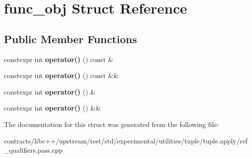 \hypertarget{structfunc__obj}{}\section{func\+\_\+obj Struct Reference}
\label{structfunc__obj}
\subsection*{Public Member Functions}
\begin{DoxyCompactItemize}
\item 
\mbox{\label{structfunc__obj_abd714d5d934540f3e192f5dba233d295}} 
constexpr int {\bfseries operator()} () const \&
\item 
\mbox{\label{structfunc__obj_a2850b3d57d5a4b64112e5f162feb6031}} 
constexpr int {\bfseries operator()} () const \&\&
\item 
\mbox{\label{structfunc__obj_ac99cdfa3c9e7d3e74af19febc6ee73d7}} 
constexpr int {\bfseries operator()} () \&
\item 
\mbox{\label{structfunc__obj_a1fb9552c6471f361ea42ab4882cc1b95}} 
constexpr int {\bfseries operator()} () \&\&
\end{DoxyCompactItemize}


The documentation for this struct was generated from the following file\+:\begin{DoxyCompactItemize}
\item 
contracts/libc++/upstream/test/std/experimental/utilities/tuple/tuple.\+apply/ref\+\_\+qualifiers.\+pass.\+cpp\end{DoxyCompactItemize}
